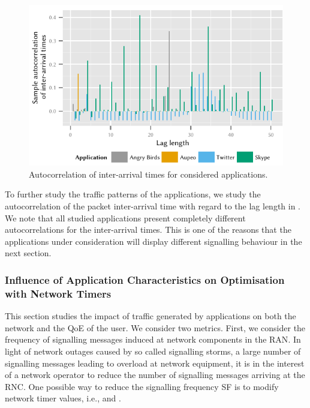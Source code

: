 \begin{figure}
\centering
\includegraphics{network/network_traces/numerical_results/figures/autocorrelation}
\caption{Autocorrelation of inter-arrival times for considered applications.}\label{fig:network:network_traces:numerical_results:traffic:autocorrelation}
\end{figure}

To further study the traffic patterns of the applications, we study the autocorrelation of the packet inter-arrival time with regard to the lag length in .
We note that all studied applications present completely different autocorrelations for the inter-arrival times.
This is one of the reasons that the applications under consideration will display different signalling behaviour in the next section.

\subsubsection*{Influence of Application Characteristics on Optimisation with Network Timers}\label{sec:network:network_traces:numerical_results:application_influence}
This section studies the impact of traffic generated by applications on both the network and the
\gls{QoE} of the user.
We consider two metrics.
First, we consider the frequency of signalling messages induced at network components in the \gls{RAN}.
In light of network outages caused by so called signalling storms, a large number of signalling messages leading to overload at network equipment, it is in the interest of a network operator to reduce the number of signalling messages arriving at the \gls{RNC}.
One possible way to reduce the signalling frequency \gls{SF} is to modify network timer values, i.e., \TDCH and \TFACH.

